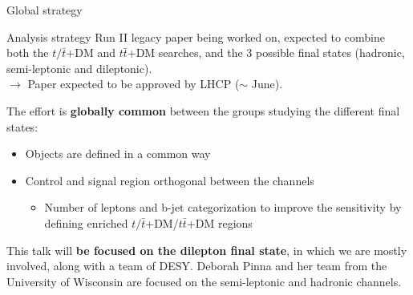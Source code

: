 \documentclass[8pt]{beamer}
\begin{document}
%













\begin{frame}[standout]
Global strategy
\end{frame}

\begin{frame}{Analysis strategy}
\justifying
Run II legacy paper being worked on, expected to \alert{combine both the $t/\bar t$+DM and $t \bar t$+DM searches}, and the 3 possible final states (hadronic, semi-leptonic and dileptonic). \\
\hspace{10pt} $\rightarrow$ Paper expected to be approved by LHCP ($\sim$ June). \vfill

The effort is \textbf{globally common} between the groups studying the different final states:
\begin{itemize}
\justifying
\item Objects are defined in a common way
\item Control and signal region orthogonal between the channels
\begin{itemize}
\justifying
\item Number of leptons and b-jet categorization to improve the sensitivity by defining enriched $t/\bar t$+DM/$t \bar t$+DM regions
\end{itemize}
\end{itemize} \vfill

This talk will \textbf{be focused on the dilepton final state}, in which we are mostly involved, along with a team of DESY. Deborah Pinna and her team from the University of Wisconsin are focused on the semi-leptonic and hadronic channels. \vfill
\end{frame}
\end{document}
